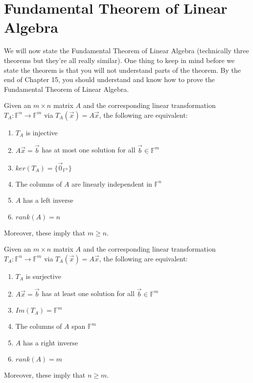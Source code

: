\section{Fundamental Theorem of Linear Algebra}
We will now state the Fundamental Theorem of Linear Algebra (technically three theorems but they're all really similar). One thing to keep in mind before we state the theorem is that you will not understand parts of the theorem. By the end of Chapter 15, you should understand and know how to prove the Fundamental Theorem of Linear Algebra.
\begin{theorem}
    Given an $m\times n$ matrix $A$ and the corresponding linear transformation $T_A:\mathbb{F}^n\to\mathbb{F}^m$ via $T_A(\vec{x})=A\vec{x}$, the following are equivalent:
    \begin{enumerate}
        \item $T_A$ is injective
        \item $A\vec{x}=\vec{b}$ has at most one solution for all $\vec{b}\in\mathbb{F}^m$
        \item $ker(T_A)=\{\vec{0}_{\mathbb{F}^n}\}$
        \item The columns of $A$ are linearly independent in $\mathbb{F}^n$
        \item $A$ has a left inverse
        \item $rank(A)=n$
    \end{enumerate}
    Moreover, these imply that $m\geq n$.
\end{theorem}
\begin{theorem}
    Given an $m\times n$ matrix $A$ and the corresponding linear transformation $T_A:\mathbb{F}^n\to\mathbb{F}^m$ via $T_A(\vec{x})=A\vec{x}$, the following are equivalent:
    \begin{enumerate}
        \item $T_A$ is surjective
        \item $A\vec{x}=\vec{b}$ has at least one solution for all $\vec{b}\in\mathbb{F}^m$
        \item $Im(T_A)=\mathbb{F}^m$
        \item The columns of $A$ span $\mathbb{F}^m$
        \item $A$ has a right inverse
        \item $rank(A)=m$
    \end{enumerate}
    Moreover, these imply that $n\geq m$.
\end{theorem}
